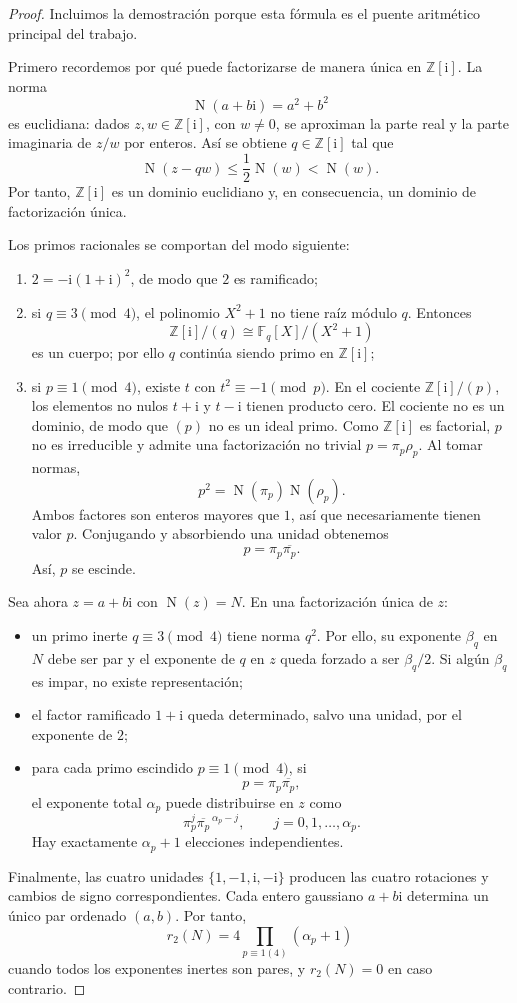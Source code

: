 \documentclass[11pt,a4paper,openany]{report}
\newcommand{\Z}{\mathbb{Z}}
\newcommand{\Norm}{\operatorname{N}}
\newcommand{\ii}{\mathrm{i}}
\begin{document}
\begin{proof}
Incluimos la demostración porque esta fórmula es el puente aritmético principal del trabajo.

Primero recordemos por qué puede factorizarse de manera única en \(\Z[\ii]\). La norma
\[
 \Norm(a+b\ii)=a^2+b^2
\]
es euclidiana: dados \(z,w\in\Z[\ii]\), con \(w\ne0\), se aproximan la parte real y la parte imaginaria de \(z/w\) por enteros. Así se obtiene \(q\in\Z[\ii]\) tal que
\[
 \Norm(z-qw)\le \frac12\Norm(w)<\Norm(w).
\]
Por tanto, \(\Z[\ii]\) es un dominio euclidiano y, en consecuencia, un dominio de factorización única.

Los primos racionales se comportan del modo siguiente:
\begin{enumerate}[label=(\alph*)]
\item \(2=-\ii(1+\ii)^2\), de modo que \(2\) es ramificado;
\item si \(q\equiv3\pmod4\), el polinomio \(X^2+1\) no tiene raíz módulo \(q\). Entonces
\[
 \Z[\ii]/(q)\cong\mathbb F_q[X]/(X^2+1)
\]
es un cuerpo; por ello \(q\) continúa siendo primo en \(\Z[\ii]\);
\item si \(p\equiv1\pmod4\), existe \(t\) con \(t^2\equiv-1\pmod p\). En el cociente \(\Z[\ii]/(p)\), los elementos no nulos \(t+\ii\) y \(t-\ii\) tienen producto cero. El cociente no es un dominio, de modo que \((p)\) no es un ideal primo. Como \(\Z[\ii]\) es factorial, \(p\) no es irreducible y admite una factorización no trivial \(p=\pi_p\rho_p\). Al tomar normas,
\[
 p^2=\Norm(\pi_p)\Norm(\rho_p).
\]
Ambos factores son enteros mayores que \(1\), así que necesariamente tienen valor \(p\). Conjugando y absorbiendo una unidad obtenemos
\[
 p=\pi_p\overline{\pi_p}.
\]
Así, \(p\) se escinde.
\end{enumerate}

Sea ahora \(z=a+b\ii\) con \(\Norm(z)=N\). En una factorización única de \(z\):
\begin{itemize}
\item un primo inerte \(q\equiv3\pmod4\) tiene norma \(q^2\). Por ello, su exponente \(\beta_q\) en \(N\) debe ser par y el exponente de \(q\) en \(z\) queda forzado a ser \(\beta_q/2\). Si algún \(\beta_q\) es impar, no existe representación;
\item el factor ramificado \(1+\ii\) queda determinado, salvo una unidad, por el exponente de \(2\);
\item para cada primo escindido \(p\equiv1\pmod4\), si
\[
 p=\pi_p\overline{\pi_p},
\]
el exponente total \(\alpha_p\) puede distribuirse en \(z\) como
\[
 \pi_p^{j}\overline{\pi_p}^{\,\alpha_p-j},
 \qquad j=0,1,\ldots,\alpha_p.
\]
Hay exactamente \(\alpha_p+1\) elecciones independientes.
\end{itemize}
Finalmente, las cuatro unidades \(\{1,-1,\ii,-\ii\}\) producen las cuatro rotaciones y cambios de signo correspondientes. Cada entero gaussiano \(a+b\ii\) determina un único par ordenado \((a,b)\). Por tanto,
\[
 r_2(N)=4\prod_{p\equiv1(4)}(\alpha_p+1)
\]
cuando todos los exponentes inertes son pares, y \(r_2(N)=0\) en caso contrario.
\end{proof}
\end{document}
